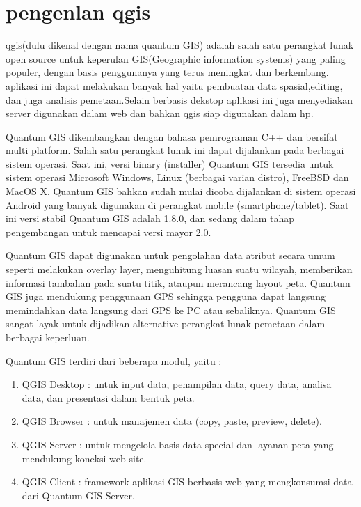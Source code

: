 
\section{pengenlan qgis}
	  qgis(dulu dikenal dengan nama quantum GIS) adalah salah satu perangkat lunak open source untuk keperulan GIS(Geographic information systems) yang paling populer, dengan basis penggunanya yang terus meningkat dan berkembang.
	 aplikasi ini dapat melakukan banyak hal yaitu pembuatan data spasial,editing, dan juga analisis pemetaan.Selain berbasis dekstop aplikasi ini juga menyediakan server digunakan dalam web dan bahkan qgis siap digunakan dalam hp.

	Quantum GIS dikembangkan dengan bahasa pemrograman C++ dan bersifat multi platform. Salah satu perangkat lunak ini dapat dijalankan pada berbagai sistem operasi. Saat ini, versi binary (installer) Quantum GIS tersedia untuk sistem operasi Microsoft Windows, Linux (berbagai varian distro), FreeBSD dan MacOS X. Quantum GIS bahkan sudah mulai dicoba dijalankan di sistem operasi Android yang banyak digunakan di perangkat mobile (smartphone/tablet). Saat ini versi stabil Quantum GIS adalah 1.8.0, dan sedang dalam tahap pengembangan untuk mencapai versi mayor 2.0.

	Quantum GIS dapat digunakan untuk pengolahan data atribut secara umum seperti melakukan overlay layer, menguhitung luasan suatu wilayah, memberikan informasi tambahan pada suatu titik, ataupun merancang layout peta. Quantum GIS juga mendukung penggunaan GPS sehingga pengguna dapat langsung memindahkan data langsung dari GPS ke PC atau sebaliknya. Quantum GIS sangat layak untuk dijadikan alternative perangkat lunak pemetaan dalam berbagai keperluan.

	Quantum GIS terdiri dari beberapa modul, yaitu :
	\begin{enumerate}
		\item QGIS Desktop : untuk input data, penampilan data, query data, analisa data, dan presentasi dalam bentuk peta.
		\item QGIS Browser : untuk manajemen data (copy, paste, preview, delete).
		\item QGIS Server : untuk mengelola basis data special dan layanan peta yang mendukung koneksi web site.
		\item QGIS Client : framework aplikasi GIS berbasis web yang mengkonsumsi data dari Quantum GIS Server.
	\end{enumerate}

